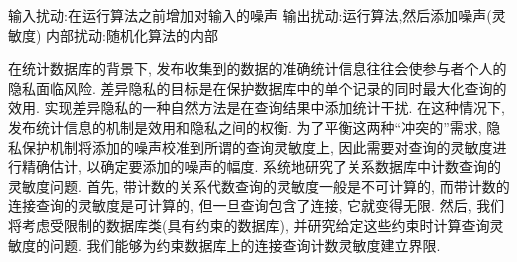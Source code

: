 输入扰动:在运行算法之前增加对输入的噪声
输出扰动:运行算法,然后添加噪声(灵敏度)
内部扰动:随机化算法的内部


在统计数据库的背景下, 发布收集到的数据的准确统计信息往往会使参与者个人的隐私面临风险. 
差异隐私的目标是在保护数据库中的单个记录的同时最大化查询的效用. 实现差异隐私的一种自然方法是在查询结果中添加统计干扰. 在这种情况下, 发布统计信息的机制是效用和隐私之间的权衡. 为了平衡这两种“冲突的”需求, 隐私保护机制将添加的噪声校准到所谓的查询灵敏度上, 因此需要对查询的灵敏度进行精确估计, 以确定要添加的噪声的幅度. \cite{Arapinis2016query}系统地研究了关系数据库中计数查询的灵敏度问题. 
首先, 带计数的关系代数查询的灵敏度一般是不可计算的, 而带计数的连接查询的灵敏度是可计算的, 但一旦查询包含了连接, 它就变得无限. 
然后, 我们将考虑受限制的数据库类(具有约束的数据库), 并研究给定这些约束时计算查询灵敏度的问题. 
我们能够为约束数据库上的连接查询计数灵敏度建立界限.  




